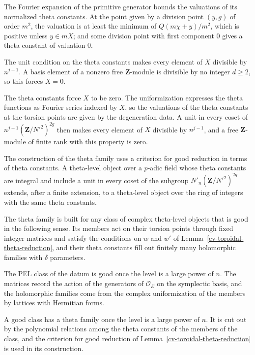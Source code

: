 The Fourier expansion of the primitive generator bounds the valuations of its normalized theta constants.
At the point given by a division point $(y,g)$ of order $m^2$, the valuation is at least the minimum of
$Q(m\chi+y)/m^2$, which is positive unless $y\in mX$; and some division point with first component $0$
gives a theta constant of valuation $0$.

The unit condition on the theta constants makes every element of $X$ divisible by $n^{j-1}$. A basis
element of a nonzero free $\mathbf Z$-module is divisible by no integer $d\ge2$, so this forces $X=0$.

The theta constants force $X$ to be zero. The uniformization expresses the theta functions as Fourier
series indexed by $X$, so the valuations of the theta constants at the torsion points are given by the
degeneration data. A unit in every coset of $n^{j-1}(\mathbf Z/N'^2)^{2g}$ then makes every element of
$X$ divisible by $n^{j-1}$, and a free $\mathbf Z$-module of finite rank with this property is zero.

The construction of the theta family uses a criterion for good reduction in terms of theta constants.
A theta-level object over a $p$-adic field whose theta constants are integral and include a unit in
every coset of the subgroup $N'_n(\mathbf Z/N'^2)^{2g}$ extends, after a finite extension, to a
theta-level object over the ring of integers with the same theta constants.

The theta family is built for any class of complex theta-level objects that is good in the following
sense. Its members act on their torsion points through fixed integer matrices and satisfy the conditions
on $w$ and $w'$ of Lemma~\ref{cv-toroidal-theta-reduction}, and their theta constants fill out finitely
many holomorphic families with $\delta$ parameters.

The PEL class of the datum is good once the level is a large power of $n$. The matrices record the action
of the generators of $\mathcal O_E$ on the symplectic basis, and the holomorphic families come from the
complex uniformization of the members by lattices with Hermitian forms.

A good class has a theta family once the level is a large power of $n$. It is cut out by the polynomial
relations among the theta constants of the members of the class, and the criterion for good reduction of
Lemma~\ref{cv-toroidal-theta-reduction} is used in its construction.


